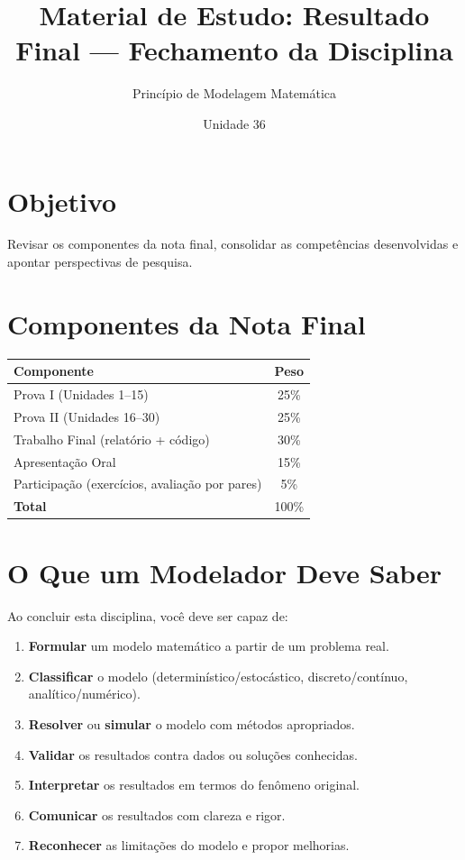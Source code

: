 \documentclass[12pt,a4paper]{article}
\title{Material de Estudo: Resultado Final --- Fechamento da Disciplina}
\author{Princ\'ipio de Modelagem Matem\'atica}
\date{Unidade 36}
\begin{document}
\maketitle

\section*{Objetivo}
Revisar os componentes da nota final, consolidar as compet\^encias desenvolvidas e apontar perspectivas de pesquisa.

\section*{Componentes da Nota Final}

\begin{tabular}{|l|c|}
\hline
\textbf{Componente} & \textbf{Peso} \\
\hline
Prova I (Unidades 1--15) & 25\% \\
Prova II (Unidades 16--30) & 25\% \\
Trabalho Final (relat\'orio + c\'odigo) & 30\% \\
Apresenta\c{c}\~ao Oral & 15\% \\
Participa\c{c}\~ao (exerc\'icios, avalia\c{c}\~ao por pares) & 5\% \\
\hline
\textbf{Total} & 100\% \\
\hline
\end{tabular}

\section*{O Que um Modelador Deve Saber}

Ao concluir esta disciplina, voc\^e deve ser capaz de:
\begin{enumerate}
  \item \textbf{Formular} um modelo matem\'atico a partir de um problema real.
  \item \textbf{Classificar} o modelo (determin\'istico/estoc\'astico, discreto/cont\'inuo, anal\'itico/num\'erico).
  \item \textbf{Resolver} ou \textbf{simular} o modelo com m\'etodos apropriados.
  \item \textbf{Validar} os resultados contra dados ou solu\c{c}\~oes conhecidas.
  \item \textbf{Interpretar} os resultados em termos do fen\^omeno original.
  \item \textbf{Comunicar} os resultados com clareza e rigor.
  \item \textbf{Reconhecer} as limita\c{c}\~oes do modelo e propor melhorias.
\end{enumerate}
\end{document}
